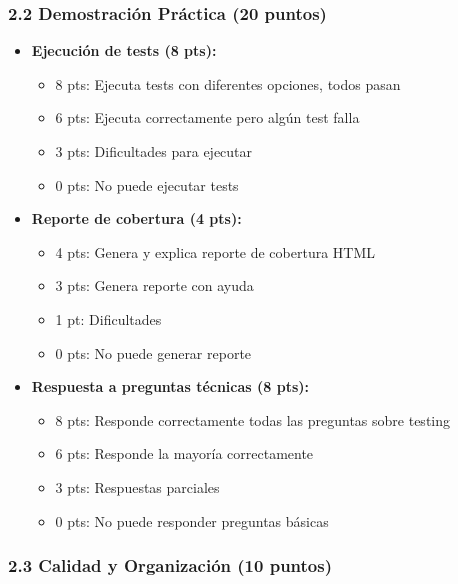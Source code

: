 \documentclass[12pt,a4paper]{article}
\begin{document}
\subsubsection{2.2 Demostración Práctica (20 puntos)}

\begin{itemize}[leftmargin=*]
    \item \textbf{Ejecución de tests (8 pts):}
    \begin{itemize}
        \item 8 pts: Ejecuta tests con diferentes opciones, todos pasan
        \item 6 pts: Ejecuta correctamente pero algún test falla
        \item 3 pts: Dificultades para ejecutar
        \item 0 pts: No puede ejecutar tests
    \end{itemize}
    
    \item \textbf{Reporte de cobertura (4 pts):}
    \begin{itemize}
        \item 4 pts: Genera y explica reporte de cobertura HTML
        \item 3 pts: Genera reporte con ayuda
        \item 1 pt: Dificultades
        \item 0 pts: No puede generar reporte
    \end{itemize}
    
    \item \textbf{Respuesta a preguntas técnicas (8 pts):}
    \begin{itemize}
        \item 8 pts: Responde correctamente todas las preguntas sobre testing
        \item 6 pts: Responde la mayoría correctamente
        \item 3 pts: Respuestas parciales
        \item 0 pts: No puede responder preguntas básicas
    \end{itemize}
\end{itemize}

\subsubsection{2.3 Calidad y Organización (10 puntos)}
\end{document}
